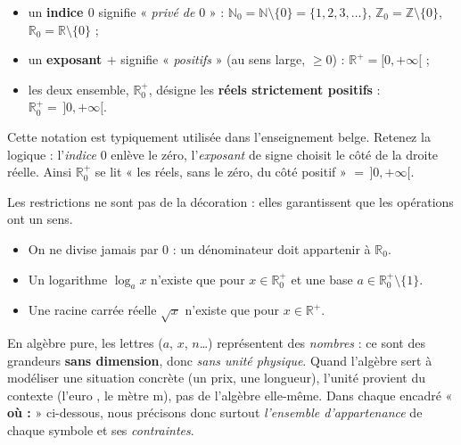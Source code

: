\documentclass[11pt,a4paper]{article}
\newcommand{\R}{\mathbb{R}}
\newcommand{\N}{\mathbb{N}}
\newcommand{\Z}{\mathbb{Z}}
\newcommand{\euro}{\texteuro}
\begin{document}
\begin{theoreme}
\begin{itemize}[leftmargin=1.6em,topsep=2pt,itemsep=1.5pt]
  \item un \textbf{indice $0$} signifie « \emph{privé de} $0$ » : \quad
        $\N_0=\N\setminus\{0\}=\{1,2,3,\dots\}$, \quad $\Z_0=\Z\setminus\{0\}$, \quad $\R_0=\R\setminus\{0\}$ ;
  \item un \textbf{exposant $+$} signifie « \emph{positifs} » (au sens large, $\geq 0$) : \quad
        $\R^{+}=[0,+\infty[$ ;
  \item les deux ensemble, $\R_0^{+}$, désigne les \textbf{réels strictement positifs} : \quad
        $\R_0^{+}=\,]0,+\infty[$.
\end{itemize}
\end{theoreme}

\begin{remarque}
Cette notation est typiquement utilisée dans l'enseignement belge. Retenez la logique :
l'\emph{indice} $0$ enlève le zéro, l'\emph{exposant} de signe choisit le côté de la droite réelle.
Ainsi $\R_0^{+}$ se lit « les réels, sans le zéro, du côté positif » $=\,]0,+\infty[$.
\end{remarque}

\begin{attention}
Les restrictions ne sont pas de la décoration : elles garantissent que les opérations ont un sens.
\begin{itemize}[leftmargin=1.6em,topsep=2pt]
  \item On ne divise jamais par $0$ : un dénominateur doit appartenir à $\R_0$.
  \item Un logarithme $\log_a x$ n'existe que pour $x\in\R_0^{+}$ et une base $a\in\R_0^{+}\setminus\{1\}$.
  \item Une racine carrée réelle $\sqrt{x}$ n'existe que pour $x\in\R^{+}$.
\end{itemize}
\end{attention}

\begin{remarque}
En algèbre pure, les lettres ($a$, $x$, $n$\dots) représentent des \emph{nombres} : ce sont des
grandeurs \textbf{sans dimension}, donc \emph{sans unité physique}. Quand l'algèbre sert à modéliser
une situation concrète (un prix, une longueur), l'unité provient du contexte (l'euro \euro{}, le mètre
\si{\metre}), pas de l'algèbre elle-même. Dans chaque encadré « \textbf{où :} » ci-dessous, nous
précisons donc surtout \emph{l'ensemble d'appartenance} de chaque symbole et ses \emph{contraintes}.
\end{remarque}
\end{document}
